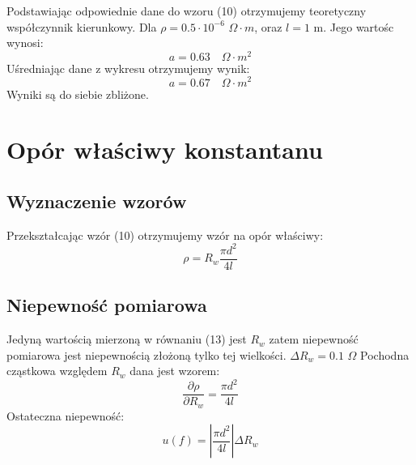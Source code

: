 \documentclass{article} %
\begin{document}
\begin{center}
\end{center}
Podstawiając odpowiednie dane do wzoru (10) otrzymujemy teoretyczny współczynnik kierunkowy. Dla $\rho = 0.5 \cdot10^{-6}$ $\Omega \cdot m$, oraz $l = 1$ m. Jego wartośc wynosi:
{\large
\begin{equation}
    a = 0.63 \quad \Omega \cdot m^2
\end{equation}
}
Uśredniając dane z wykresu otrzymujemy wynik:
{\large
\begin{equation}
    a = 0.67 \quad \Omega \cdot m^2
\end{equation}
}
Wyniki są do siebie zbliżone.
\section{Opór właściwy konstantanu}
\subsection{Wyznaczenie wzorów}
Przekształcając wzór (10) otrzymujemy wzór na opór właściwy:
{\large
\begin{equation}
    \rho = R_w\frac{\pi d^2}{4l}
\end{equation}
}
\subsection{Niepewność pomiarowa}
Jedyną wartością mierzoną w równaniu (13) jest $R_w$ zatem niepewność pomiarowa jest niepewnością złożoną tylko tej wielkości. $\Delta R_w = 0.1$ $\Omega$ Pochodna cząstkowa względem $R_w$ dana jest wzorem:
{\large
\begin{equation}
    \frac{\partial \rho}{\partial R_w} = \frac{\pi d^2}{4l}
\end{equation}
}
Ostateczna niepewność:
{\large
\begin{equation}
    u(f) =  |\frac{\pi d^2}{4l}|\Delta R_w
\end{equation}
}
\end{document}
